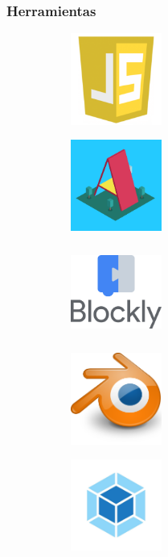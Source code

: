 \documentclass[xcolor={table}]{beamer}
\begin{document}
		\begin{frame}
			\frametitle{Herramientas}
\begin{figure}[H]
\centering
\begin{subfigure}{\textwidth}
    \includegraphics[width=3cm, height=3cm]{img/js.png}
\label{fig:figure2_4}
\end{subfigure}
\begin{subfigure}{\textwidth}
    \includegraphics[width=3cm, height=3cm]{img/aframe.png}
\label{fig:figure2_5}
\end{subfigure}\hfill
\begin{subfigure}{\textwidth}
    \includegraphics[width=3cm, height=3cm]{img/blockly.png}
\label{fig:figure2_6}
\end{subfigure}\hfill
\begin{subfigure}{\textwidth}
    \includegraphics[width=3cm, height=3cm]{img/blender.png}
\label{fig:figure2_7}
\end{subfigure}\hfill
\begin{subfigure}{\textwidth}
    \includegraphics[width=3cm, height=3cm]{img/webpack.jpeg}

\end{subfigure}
\end{figure}
\end{frame}
\end{document}
